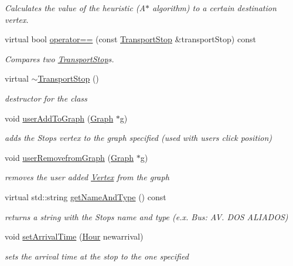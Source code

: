 \begin{DoxyCompactItemize}
\begin{DoxyCompactList}\small\item\em Calculates the value of the heuristic (A$\ast$ algorithm) to a certain destination vertex. \end{DoxyCompactList}\item 
virtual bool \hyperlink{class_transport_stop_a49e75a0fc1e7e2b62fe0a6894ba4e12a}{operator==} (const \hyperlink{class_transport_stop}{Transport\+Stop} \&transport\+Stop) const 
\begin{DoxyCompactList}\small\item\em Compares two \hyperlink{class_transport_stop}{Transport\+Stop}\textquotesingle{}s. \end{DoxyCompactList}\item 
\hypertarget{class_transport_stop_aa320bbb6a30f75d415cf7a37bb4ab6bd}{}virtual \hyperlink{class_transport_stop_aa320bbb6a30f75d415cf7a37bb4ab6bd}{$\sim$\+Transport\+Stop} ()\label{class_transport_stop_aa320bbb6a30f75d415cf7a37bb4ab6bd}

\begin{DoxyCompactList}\small\item\em destructor for the class \end{DoxyCompactList}\item 
void \hyperlink{class_transport_stop_aaa8fd2447f2d70ef03163e679620730a}{user\+Add\+To\+Graph} (\hyperlink{class_graph}{Graph} $\ast$g)
\begin{DoxyCompactList}\small\item\em adds the Stop\textquotesingle{}s vertex to the graph specified (used with user\textquotesingle{}s click position) \end{DoxyCompactList}\item 
void \hyperlink{class_transport_stop_a98fe1e72c2188413957cc39269a04874}{user\+Removefrom\+Graph} (\hyperlink{class_graph}{Graph} $\ast$g)
\begin{DoxyCompactList}\small\item\em removes the user added \hyperlink{class_vertex}{Vertex} from the graph \end{DoxyCompactList}\item 
virtual std\+::string \hyperlink{class_transport_stop_a245cff19d0ef473d56b93036042478ef}{get\+Name\+And\+Type} () const 
\begin{DoxyCompactList}\small\item\em returns a string with the Stop\textquotesingle{}s name and type (e.\+x. Bus\+: A\+V. D\+O\+S A\+L\+I\+A\+D\+O\+S) \end{DoxyCompactList}\item 
void \hyperlink{class_transport_stop_a55374e514b51c860efae36497636ef3d}{set\+Arrival\+Time} (\hyperlink{class_hour}{Hour} newarrival)
\begin{DoxyCompactList}\small\item\em sets the arrival time at the stop to the one specified \end{DoxyCompactList}\end{DoxyCompactItemize}
